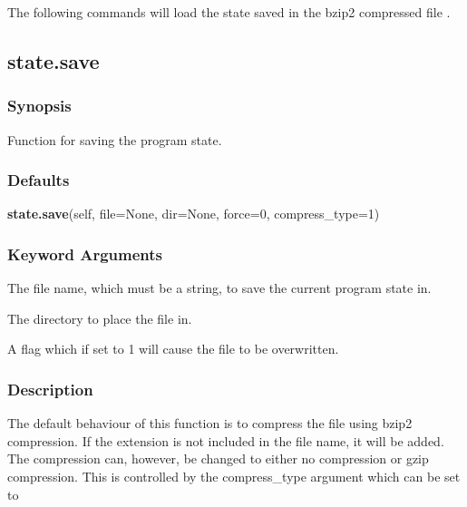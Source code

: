 The following commands will load the state saved in the bzip2 compressed file .








\newpage

\subsection{state.save}


\subsubsection{Synopsis}

Function for saving the program state.



\subsubsection{Defaults}

\textsf{\textbf{state.save}(self, file=None, dir=None, force=0, compress\_type=1)}


\subsubsection{Keyword Arguments}

  The file name, which must be a string, to save the current program state in. 

  The directory to place the file in. 

  A flag which if set to 1 will cause the file to be overwritten. 




\subsubsection{Description}

The default behaviour of this function is to compress the file using bzip2 compression.  If the extension  is not included in the file name, it will be added.  The compression can, however, be changed to either no compression or gzip compression.  This is controlled by the compress\_type argument which can be set to


